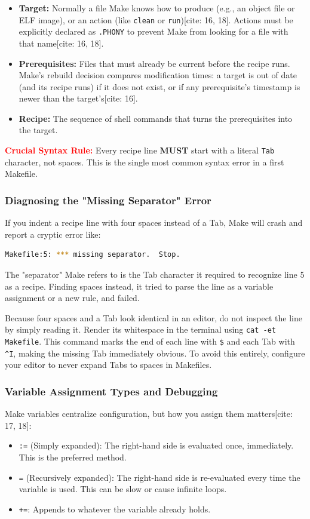 \begin{itemize}
    \item \textbf{Target:} Normally a file Make knows how to produce (e.g., an object file or ELF image), or an action (like \texttt{clean} or \texttt{run})[cite: 16, 18]. Actions must be explicitly declared as \texttt{.PHONY} to prevent Make from looking for a file with that name[cite: 16, 18].
    \item \textbf{Prerequisites:} Files that must already be current before the recipe runs. Make's rebuild decision compares modification times: a target is out of date (and its recipe runs) if it does not exist, or if any prerequisite's timestamp is newer than the target's[cite: 16].
    \item \textbf{Recipe:} The sequence of shell commands that turns the prerequisites into the target. 
\end{itemize}

\textbf{\textcolor{red}{Crucial Syntax Rule:}} Every recipe line \textbf{MUST} start with a literal \texttt{Tab} character, not spaces. This is the single most common syntax error in a first Makefile.

\subsubsection{Diagnosing the "Missing Separator" Error}
If you indent a recipe line with four spaces instead of a Tab, Make will crash and report a cryptic error like:
\begin{lstlisting}[language=bash]
Makefile:5: *** missing separator.  Stop.
\end{lstlisting}
The "separator" Make refers to is the Tab character it required to recognize line 5 as a recipe. Finding spaces instead, it tried to parse the line as a variable assignment or a new rule, and failed. 

Because four spaces and a Tab look identical in an editor, do not inspect the line by simply reading it. Render its whitespace in the terminal using \texttt{cat -et Makefile}. This command marks the end of each line with \texttt{\$} and each Tab with \texttt{\textasciicircum I}, making the missing Tab immediately obvious. To avoid this entirely, configure your editor to never expand Tabs to spaces in Makefiles.

\subsubsection{Variable Assignment Types and Debugging}
Make variables centralize configuration, but how you assign them matters[cite: 17, 18]:
\begin{itemize}
    \item \texttt{:=} (Simply expanded): The right-hand side is evaluated once, immediately. This is the preferred method.
    \item \texttt{=} (Recursively expanded): The right-hand side is re-evaluated every time the variable is used. This can be slow or cause infinite loops.
    \item \texttt{+=}: Appends to whatever the variable already holds.
\end{itemize}

